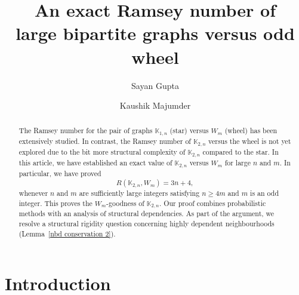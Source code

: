 \documentclass[reqno,10pt]{amsart}
\title[Ramsey number involving  bipartite graphs and odd wheel]{An exact Ramsey number of \\ 
large bipartite graphs versus odd wheel}
\author{Sayan Gupta}
\author{Kaushik Majumder}
\theoremstyle{definition}
\begin{document}
\thispagestyle{empty}
\vspace{10cm}

\begin{abstract}
The Ramsey number for the pair of graphs $\mathbb{K}_{1,n}$ (star) versus $W_{m}$ (wheel) has been extensively studied. In contrast, the Ramsey number of $\mathbb{K}_{2,n}$ versus the wheel is not yet explored due to the bit more structural complexity of $\mathbb{K}_{2,n}$ compared to the star. In this article, we have established an exact value of $\mathbb{K}_{2,n}$ versus $W_{m}$ for large $n$ and $m$. In particular, we have proved 
\begin{equation*}
R(\mathbb{K}_{2,n}, W_{m})=3n+4,
\end{equation*}
whenever $n$ and $m$ are sufficiently large integers satisfying $n\geq4m$ and $m$ is an odd integer. This proves the $W_{m}$-goodness of $\mathbb{K}_{2,n}$. Our proof combines probabilistic methods with an analysis of structural dependencies. As part of the argument, we resolve a structural rigidity question concerning highly dependent neighbourhoods (Lemma~\ref{nbd conservation 2}). 
\end{abstract}

\maketitle

\section{Introduction}
\end{document}
